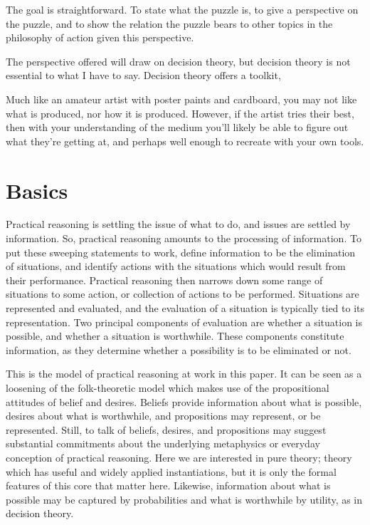 \documentclass[10pt]{article}
\begin{document}
The goal is straightforward.
To state what the puzzle is, to give a perspective on the puzzle, and to show the relation the puzzle bears to other topics in the philosophy of action given this perspective.

The perspective offered will draw on decision theory, but decision theory is not essential to what I have to say.
Decision theory offers a toolkit,

Much like an amateur artist with poster paints and cardboard, you may not like what is produced, nor how it is produced.
However, if the artist tries their best, then with your understanding of the medium you'll likely be able to figure out what they're getting at, and perhaps well enough to recreate with your own tools.

\newpage

\section{Basics}
\label{sec:basics}


Practical reasoning is settling the issue of what to do, and issues are settled by information.
So, practical reasoning amounts to the processing of information.
To put these sweeping statements to work, define information to be the elimination of situations, and identify actions with the situations which would result from their performance.
Practical reasoning then narrows down some range of situations to some action, or collection of actions to be performed.
Situations are represented and evaluated, and the evaluation of a situation is typically tied to its representation.
Two principal components of evaluation are whether a situation is possible, and whether a situation is worthwhile.
These components constitute information, as they determine whether a possibility is to be eliminated or not.

This is the model of practical reasoning at work in this paper.
It can be seen as a loosening of the folk-theoretic model which makes use of the propositional attitudes of belief and desires.
Beliefs provide information about what is possible, desires about what is worthwhile, and propositions may represent, or be represented.
Still, to talk of beliefs, desires, and propositions may suggest substantial commitments about the underlying metaphysics or everyday conception of practical reasoning.
Here we are interested in pure theory; theory which has useful and widely applied instantiations, but it is only the formal features of this core that matter here.
Likewise, information about what is possible may be captured by probabilities and what is worthwhile by utility, as in decision theory.
\end{document}
